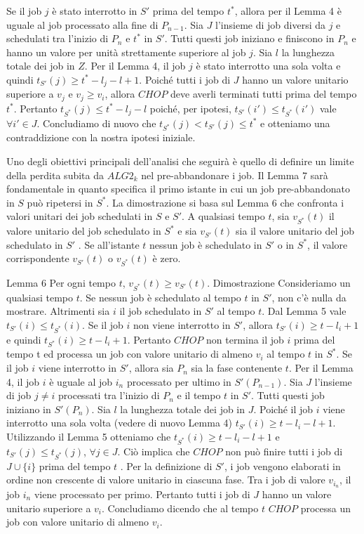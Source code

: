 \documentclass[12pt]{article}
\begin{document}
Se il job $j$ è stato interrotto in $S'$ prima del tempo $t^{*}$, allora per il Lemma 4 è uguale al job processato alla fine di $P_{n - 1}$. Sia $J$ l'insieme di job diversi da $j$ e schedulati tra l'inizio di $P_{n}$ e $t^{*}$ in $S'$. Tutti questi job iniziano e finiscono in $P_{n}$ e hanno un valore per unità strettamente superiore al job $j$. Sia $l$ la lunghezza totale dei job in $Z$. Per il Lemma 4, il job $j$ è stato interrotto una sola volta e quindi $t_{S'}(j) \geq t^{*} - l_{j} - l + 1$. Poiché tutti i job di $J$ hanno un valore unitario superiore a $v_{j}$ e $v_{j} \geq v_{i}$, allora $CHOP$ deve averli terminati tutti prima del tempo $t^{*}$. Pertanto $t_{S^{*}}(j) \leq t^{*} - l_{j} - l$ poiché, per ipotesi, $t_{S'}(i') \leq t_{S^{*}}(i')$ vale $\forall i' \in J$. Concludiamo di nuovo che $t_{S^{*}}(j) < t_{S'}(j) \leq t^{*}$ e otteniamo una contraddizione con la nostra ipotesi iniziale.

Uno degli obiettivi principali dell'analisi che seguirà è quello di definire un limite della perdita subita da $ALG2_{k}$ nel pre-abbandonare i job. Il Lemma 7 sarà fondamentale in quanto specifica il primo istante in cui un job pre-abbandonato in $S$ può ripetersi in $S^{*}$. La dimostrazione si basa sul Lemma 6 che confronta i valori unitari dei job schedulati in $S$ e $S'$. A qualsiasi tempo $t$, sia $v_{S^{*}}(t)$ il valore unitario del job schedulato in $S^{*}$ e sia $v_{S'}(t)$ sia il valore unitario del job schedulato in $S'$ . Se all'istante $t$ nessun job è schedulato in $S'$ o in $S^{*}$, il valore corrispondente $v_{S'}(t)$ o $v_{S^{*}}(t)$ è zero.

Lemma 6
Per ogni tempo $t$, $v_{S^{*}}(t) \geq v_{S'}(t).$
Dimostrazione
Consideriamo un qualsiasi tempo $t$. Se nessun job è schedulato al tempo $t$ in $S'$, non c'è nulla da mostrare. Altrimenti sia $i$ il job schedulato in $S'$ al tempo $t$. Dal Lemma 5 vale $t_{S'}(i) \leq t_{S^{*}}(i)$. Se il job $i$ non viene interrotto in $S'$, allora $t_{S'}(i) \geq t - l_{i} + 1$ e quindi $t_{S^{*}}(i) \geq t - l_{i} +1$. Pertanto $CHOP$ non termina il job $i$ prima del tempo t ed processa un job con valore unitario di almeno $v_{i}$ al tempo $t$ in $S^{*}$. Se il job $i$ viene interrotto in $S'$, allora sia $P_{n}$ sia la fase contenente $t$. Per il Lemma 4, il job $i$ è uguale al job $i_{n}$ processato per ultimo in $S'(P_{n - 1})$. Sia $J$ l'insieme di job $j \ne i$ processati tra l'inizio di $P_{n}$ e il tempo $t$ in $S'$. Tutti questi job iniziano in $S'(P_{n})$. Sia $l$ la lunghezza totale dei job in $J$. Poiché il job $i$ viene interrotto una sola volta (vedere di nuovo Lemma 4) $t_{S'}(i) \geq t - l_{i} - l + 1$. Utilizzando il Lemma 5 otteniamo che $t_{S^{*}}(i) \geq t - l_{i} - l + 1$ e $t_{S'}(j) \leq t_{S^{*}}(j)$, $\forall j \in J$. Ciò implica che $CHOP$ non può finire tutti i job di $J \cup \{i\}$ prima del tempo $t$ . Per la definizione di $S'$, i job vengono elaborati in ordine non crescente di valore unitario in ciascuna fase. Tra i job di valore $v_{i_{n}}$, il job $i_{n}$ viene processato per primo. Pertanto tutti i job di $J$ hanno un valore unitario superiore a $v_{i}$. Concludiamo dicendo che al tempo $t$ $CHOP$ processa un job con valore unitario di almeno $v_{i}$.
\end{document}
